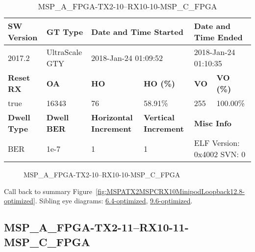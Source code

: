 \begin{table}[h]
\centering
\caption{MSP\_A\_FPGA-TX2-10--RX10-10-MSP\_C\_FPGA}
\label{tab:MSPAFPGATX210RX1010MSPCFPGA12.8-optimized}
\begin{tabular}{@{}|l|l|l|l|l|l|@{}}
\toprule
\textbf{SW Version}                & \textbf{GT Type}   & \multicolumn{2}{l|}{\textbf{Date and Time Started}}            & \multicolumn{2}{l|}{\textbf{Date and Time Ended}}        \\ \midrule
2017.2                       & UltraScale GTY          & \multicolumn{2}{l|}{2018-Jan-24 01:09:52}                   & \multicolumn{2}{l|}{2018-Jan-24 01:10:35}               \\ \midrule
\textbf{Reset RX}                  & \textbf{OA} & \textbf{HO}   & \textbf{HO (\%)} & \textbf{VO} & \textbf{VO (\%)} \\ \midrule
true & 16343        & 76          & 58.91\%        & 255        & 100.00\%       \\ \midrule
\textbf{Dwell Type}                & \textbf{Dwell BER} & \textbf{Horizontal Increment} & \textbf{Vertical Increment}    & \multicolumn{2}{l|}{\textbf{Misc Info}}                  \\ \midrule
BER                            & 1e-7        & 1        & 1           & \multicolumn{2}{l|}{ELF Version: 0x4002 SVN: 0}                         \\ \bottomrule
\end{tabular}
\end{table}

\begin{figure}[h]
\caption{MSP\_A\_FPGA-TX2-10--RX10-10-MSP\_C\_FPGA} \label{fig:MSPAFPGATX210RX1010MSPCFPGA12.8-optimized}
\end{figure}

Call back to summary Figure~\ref{fig:MSPATX2MSPCRX10MinipodLoopback12.8-optimized}.
Sibling eye diagrams: \hyperref[sec:MSPAFPGATX210RX1010MSPCFPGA6.4-optimized]{6.4-optimized}, \hyperref[sec:MSPAFPGATX210RX1010MSPCFPGA9.6-optimized]{9.6-optimized}.

\clearpage
\newpage


\subsection{MSP\_A\_FPGA-TX2-11--RX10-11-MSP\_C\_FPGA}\label{sec:MSPAFPGATX211RX1011MSPCFPGA12.8-optimized}

